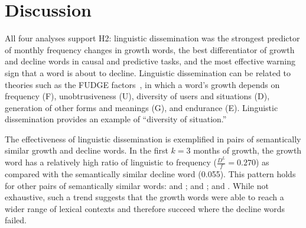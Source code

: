 \section{Discussion}



All four analyses support H2: linguistic dissemination was the strongest predictor of monthly frequency changes in growth words, the best differentiator of growth and decline words in causal and predictive tasks, and the most effective warning sign that a word is about to decline.
Linguistic dissemination can be related to theories such as the FUDGE factors~\cite{chesley2010,cook2010neologism,metcalf2004}, in which a word's growth depends on frequency (F), unobtrusiveness (U), diversity of users and situations (D), generation of other forms and meanings (G), and endurance (E). 
Linguistic dissemination provides an example of ``diversity of situation.'' 

The effectiveness of linguistic dissemination is exemplified in pairs of semantically similar growth and decline words.
In the first $k=3$ months of growth, the growth word  has a relatively high ratio of linguistic to frequency ($\frac{D^{L}}{f}=0.270$) as compared with the semantically similar decline word  (0.055).
This pattern holds for other pairs of semantically similar words:  and ;  and ;  and .
While not exhaustive, such a trend suggests that the growth words were able to reach a wider range of lexical contexts and therefore succeed where the decline words failed.

